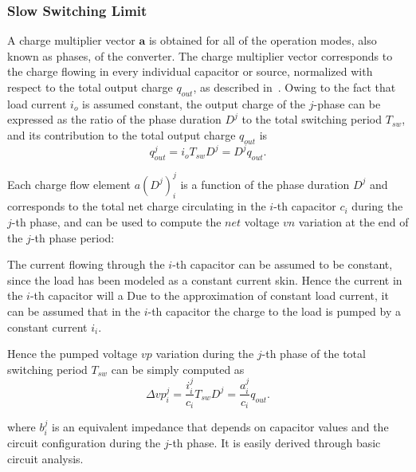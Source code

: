 \subsubsection[SSL]{Slow Switching Limit}

A charge multiplier vector $\mathbf{a}$ is obtained for all of the operation modes, also known as phases, of the converter. The charge multiplier vector corresponds to the charge flowing in every individual capacitor or source, normalized with respect to the total output charge $q_{out}$, as described in~\cite{95Makowski,Seeman:EECS-2009-78}. Owing to the fact that load current $i_o$ is assumed constant, the output charge of the $j$-phase can be expressed as the ratio of the phase duration $D^j$ to the total switching period $T_{sw}$, and its contribution to the total output charge $q_{out}$ is
\begin{equation}
    q^j_{out} = i_{o} T_{sw} D^j = D^j q_{out} .
\label{eq:qout}
\end{equation}

Each charge flow element $ a(D^j)_i^j$  is a function of the phase duration $D^j$ and corresponds to the total net charge circulating in the $i$-th capacitor $c_i$ during the $j$-th phase, and can be used to compute the $net$ voltage $vn$ variation at the end of the $j$-th phase period:

The current flowing through the $i$-th capacitor can be assumed to be constant, since the load has been modeled as a constant current skin. Hence the current in the $i$-th capacitor will a
Due to the approximation of constant load current, it can be assumed that in the $i$-th capacitor the charge to the load is pumped by a constant current $i_i$.

Hence the pumped voltage $vp$ variation during the $j$-th phase of the total switching period $T_{sw}$ can be simply computed as
\begin{equation}
\Delta {vp}^j_i  = \frac{i_i^j}{c_i} T_{sw} D^j = \frac{a_i ^j }{c_i} q_{out} .
\label{eq:pumped_voltage}
\end{equation}

where $b_i^j$ is an equivalent impedance that depends on capacitor values and the circuit configuration during the $j$-th phase. It is easily derived through basic circuit analysis.

